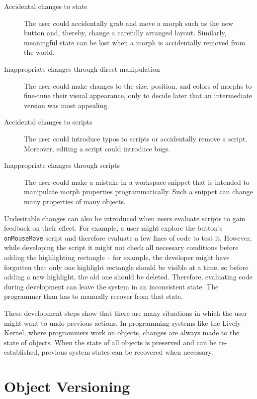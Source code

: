 \documentclass{sigplanconf}
\begin{document}
\begin{description}
\item[Accidental changes to state] The user could accidentally grab
  and move a morph such as the new button and, thereby, change a
  carefully arranged layout. Similarly, meaningful state can be lost
  when a morph is accidentally removed from the world.
\item[Inappropriate changes through direct manipulation] The user
  could make changes to the size, position, and colors of morphs to
  fine-tune their visual appearance, only to decide later that an
  intermediate version was most appealing.
\item[Accidental changes to scripts] The user could introduce typos
  to scripts or accidentally remove a script. Moreover, editing a
  script could introduce bugs.
\item[Inappropriate changes through scripts] The user could
  make a mistake in a workspace snippet that is intended to manipulate
  morph properties programmatically. Such a snippet can change many
  properties of many objects.
\end{description}

Undesirable changes can also be introduced when users evaluate scripts
to gain feedback on their effect. For example, a user might explore
the button's \lstinline{onMouseMove} script and therefore evaluate a
few lines of code to test it.  However, while developing the script it
might not check all necessary conditions before adding the
highlighting rectangle -- for example, the developer might have
forgotten that only one highlight rectangle should be visible at a
time, so before adding a new highlight, the old one should be
deleted. Therefore, evaluating code during development can leave the
system in an inconsistent state.
The programmer than has to manually recover from that state.

These development steps show that there are many situations in which
the user might want to undo previous actions.  In programming systems
like the Lively Kernel, where programmers work on objects, changes are
always made to the state of objects. When the state of all objects is
preserved and can be re-established, previous system states can be
recovered when necessary.


\section{Object Versioning} \label{chapter:APPROACH}
\end{document}
